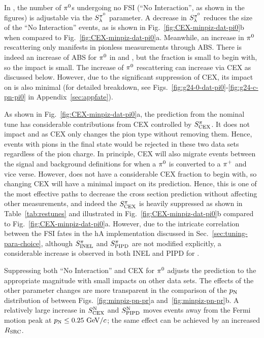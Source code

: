 In \minpiz, the number of $\pi^0$s undergoing no FSI (``No Interaction'', as shown in the figures) is adjustable via the $S_\lambda^{\pi^{0}}$ parameter. A decrease in $S_\lambda^{\pi^{0}}$ reduces the size of the ``No Interaction'' events,  as is shown in Fig.~\ref{fig:CEX-minpiz-dat-pi0}b when compared to Fig.~\ref{fig:CEX-minpiz-dat-pi0}a. Meanwhile, an increase in $\pi^0$ rescattering only manifests in pionless measurements through ABS. There is indeed an increase of ABS for $\pi^0$ in \ttkzpi and \minzpi, but the fraction is small to begin with, so the impact is small. The increase of $\pi^0$ rescattering can increase \ttkpip via CEX as discussed below. However, due to the significant suppression of CEX, its impact on \ttkpip is also minimal (for detailed breakdown, see Figs.~\ref{fig:g24-0-dat-pi0}-\ref{fig:g24-c-pn-pi0} in Appendix~\ref{sec:appfate}). 

As shown in Fig.~\ref{fig:CEX-minpiz-dat-pi0}a, the \minpiz prediction from the nominal tune has considerable contributions from CEX controlled by $S_\textrm{CEX}^{\pi}$. It does not impact \ttkzpi and \minzpi as CEX only changes the pion type without removing them. Hence, events with pions in the final state would be rejected in these two data sets regardless of the pion charge. In principle, CEX will also migrate events between the signal and background definitions for \ttkpip when a $\pi^0$ is converted to a $\pi^+$ and vice verse. However, \ttkpip does not have a considerable CEX fraction to begin with, so changing CEX will have a minimal impact on its prediction. Hence, this is one of the most effective paths to decrease the \minpiz cross section prediction without affecting other measurements, and indeed the $S_\textrm{CEX}^{\pi}$ is heavily suppressed as shown in Table~\ref{tab:restunes} and illustrated in Fig.~\ref{fig:CEX-minpiz-dat-pi0}b compared to Fig.~\ref{fig:CEX-minpiz-dat-pi0}a. However, due to the intricate correlation between the FSI fates in the hA implementation discussed in Sec.~\ref{sec:tuning-para-choice}, although $S_\textrm{INEL}^{\pi}$ and $S_\textrm{PIPD}^{\pi}$ are not modified explicitly, a considerable increase is observed in both INEL and PIPD for \minpiz. 

Suppressing both ``No Interaction'' and CEX for $\pi^0$ adjusts the \minpiz prediction to the appropriate magnitude with small impacts on other data sets.  The effects of the other parameter changes are more transparent in the comparison of the $p_\textrm{N}$ distribution of \minpiz between Figs.~\ref{fig:minpiz-pn-pr}a and~\ref{fig:minpiz-pn-pr}b. A relatively large increase in $S_\textrm{CEX}^\textrm{N}$ and $S_\textrm{PIPD}^\textrm{N}$ moves events away from the Fermi motion peak at $p_\textrm{N}\leq0.25~\textrm{GeV}/c$; the same effect can be achieved by an increased $R_\textrm{SRC}$. 

